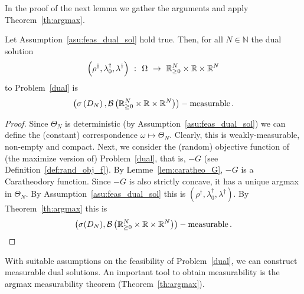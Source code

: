   In the proof of the next lemma we gather the arguments and apply Theorem~\ref{th:argmax}.
\begin{lemma}
  \label{lem:meas_dual_sol}
  Let Assumption~\ref{asu:feas_dual_sol} hold true.
  Then,
  for all $N\in\mathbb{N}$ the dual solution
  \begin{align*}
  \left( \rho^\dagger,\lambda_0^\dagger,\lambda^\dagger \right)
    \ 
    \colon
   \  
    \Omega
    \ 
    \to
    \ 
  \R^N_{\ge 0}
  \times
  \R
  \times
  \R^{N}
  \end{align*}
  to
  Problem~\ref{dual} 
  is
  \begin{align*}
  \left(
    \sigma \left( D_N \right),\mathcal{B}
  \left(
  \mathbb{R}^N_{\ge 0}
  \times
  \mathbb{R}
  \times
  \mathbb{R}^{N}
  \right)
  \right)
  -\text{measurable}
  \,.
  \end{align*}
\end{lemma}
\begin{proof}
  Since $\Theta_N$ is deterministic (by Assumption~\ref{asu:feas_dual_sol})
  we can define the (constant) correspondence
  $\omega \mapsto \Theta_N$.
  Clearly, this is weakly-measurable, non-empty and compact.
  Next, we consider the (random) objective function of (the maximize version of) Problem~\ref{dual}, that is, $-G$ (see Definition~\ref{def:rand_obj_f}).
  By Lemme~\ref{lem:caratheo_G}, $-G$  is a Caratheodory function.
  Since $-G$ is also strictly concave, it has a unique argmax in $\Theta_N$.
  By Assumption~\ref{asu:feas_dual_sol} this is 
  $
  \left( \rho^\dagger,\lambda_0^\dagger,\lambda^\dagger \right)
  $.
  By Theorem~\ref{th:argmax} this is
  \begin{align*}
  \left(
    \sigma
    (D_N)
    ,\mathcal{B}
  \left(
  \mathbb{R}^N_{\ge 0}
  \times
  \mathbb{R}
  \times
  \mathbb{R}^{N}
  \right)
  \right)
  -\text{measurable}
  \,.
  \end{align*}
\end{proof}

\begin{takeaways}
  With suitable assumptions on the feasibility of Problem~\ref{dual}, we can construct measurable dual solutions.
  An important tool to obtain measurability is the argmax measurability theorem (Theorem~\ref{th:argmax}).
\end{takeaways}
